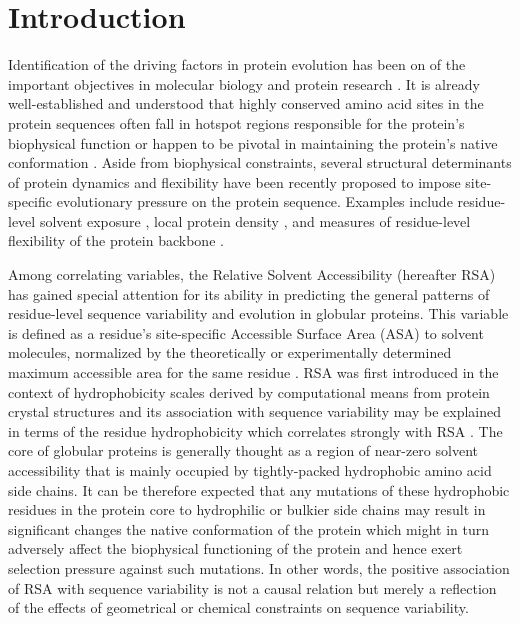 \documentclass[12pt]{article}
\begin{document}
\section*{Introduction}

Identification of the driving factors in protein evolution has been on of the important objectives in molecular biology and protein research \citep{rocha_quest_2006,MarshTeichmann2014}. It is already well-established and understood that highly conserved amino acid sites in the protein sequences often fall in hotspot regions responsible for the protein's biophysical function or happen to be pivotal in maintaining the protein's native conformation \citep{li_proteinprotein_2004, keskin_hot_2005}. Aside from biophysical constraints, several structural determinants of protein dynamics and flexibility have been recently proposed to impose site-specific evolutionary pressure on the protein sequence. Examples include residue-level solvent exposure \citep{Ramseyetal2011,Scherreretal2012,MeyerWilke2013, other_authors}, local protein density \citep{liao_protein_2005, zhou_contact_2008, FranzosaXia2009, yeh_site-specific_2014}, and measures of residue-level flexibility of the protein backbone \citep{liu_sequence_2012, nevin_gerek_structural_2013}.

Among correlating variables, the Relative Solvent Accessibility (hereafter RSA) has gained special attention for its ability in predicting the general patterns of residue-level sequence variability and evolution in globular proteins. This variable is defined as a residue's site-specific Accessible Surface Area (ASA) to solvent molecules, normalized by the theoretically or experimentally determined maximum accessible area for the same residue \citep{Rose1985,Tienetal2013}. RSA was first introduced in the context of hydrophobicity scales derived by computational means from protein crystal structures \citep{Chothia1976, Rose1985, Miller1987} and its association with sequence variability may be explained in terms of the residue hydrophobicity which correlates strongly with RSA \citep{moelbert_correlation_2004}. The core of globular proteins is generally thought as a region of near-zero solvent accessibility that is mainly occupied by tightly-packed hydrophobic amino acid side chains. It can be therefore expected that any mutations of these hydrophobic residues in the protein core to hydrophilic or bulkier side chains may result in significant changes the native conformation of the protein \citep{munson_what_1996} which might in turn adversely affect the biophysical functioning of the protein and hence exert selection pressure against such mutations. In other words, the positive association of RSA with sequence variability is not a causal relation but merely a reflection of the effects of geometrical or chemical constraints on sequence variability.
\end{document}
